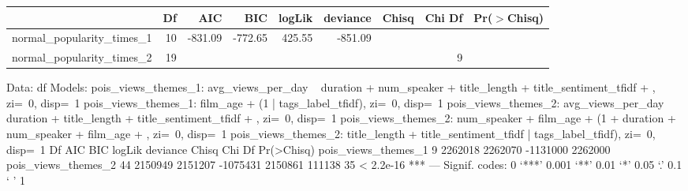 \begin{table}[ht]
\centering
\begin{tabular}{lrrrrrrrr}
  \hline
 & Df & AIC & BIC & logLik & deviance & Chisq & Chi Df & Pr($>$Chisq) \\ 
  \hline
normal\_popularity\_times\_1 & 10 & -831.09 & -772.65 & 425.55 & -851.09 &  &  &  \\ 
  normal\_popularity\_times\_2 & 19 &  &  &  &  &  & 9 &  \\ 
   \hline
\end{tabular}
\end{table}
Data: df
Models:
pois_views_themes_1: avg_views_per_day ~ duration + num_speaker + title_length + title_sentiment_tfidf + , zi=~0, disp=~1
pois_views_themes_1:     film_age + (1 | tags_label_tfidf), zi=~0, disp=~1
pois_views_themes_2: avg_views_per_day ~ duration + title_length + title_sentiment_tfidf + , zi=~0, disp=~1
pois_views_themes_2:     num_speaker + film_age + (1 + duration + num_speaker + film_age + , zi=~0, disp=~1
pois_views_themes_2:     title_length + title_sentiment_tfidf | tags_label_tfidf), zi=~0, disp=~1
                    Df     AIC     BIC   logLik deviance  Chisq Chi Df Pr(>Chisq)    
pois_views_themes_1  9 2262018 2262070 -1131000  2262000                             
pois_views_themes_2 44 2150949 2151207 -1075431  2150861 111138     35  < 2.2e-16 ***
---
Signif. codes:  0 ‘***’ 0.001 ‘**’ 0.01 ‘*’ 0.05 ‘.’ 0.1 ‘ ’ 1
